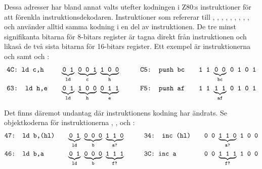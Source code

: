 \documentclass[main.tex]{subfiles}
\begin{document}
Dessa adresser har bland annat valts utefter kodningen i Z80:s instruktioner
för att förenkla instruktionsdekodaren. Instruktioner som refererar till
, , , , , , ,
, ,  och  använder alltid samma kodning i
en del av instruktionen. De tre minst signifikanta bitarna för 8-bitars
register är tagna direkt från instruktionen och likaså de två sista bitarna för
16-bitars register. Ett exempel är instruktionerna  och  samt  och :
\begin{align*}
    &\texttt{4C: ld c,h}& \quad &
    {\underbrace{\texttt{0 1}}_{\texttt{ld}}}\texttt{ }
    {\underbrace{\texttt{0 0 1}}_{\texttt{c}}}\texttt{ }
    {\underbrace{\texttt{1 0 0}}_{\texttt{h}}}
    \qquad
    &\texttt{C5: push bc}& \quad &
    \texttt{1 1 }
    {\underbrace{\texttt{0 0}}_{\texttt{bc}}}\texttt{ }
    \texttt{0 1 0 1}
    \\
    &\texttt{63: ld h,e} &&
    {\underbrace{\texttt{0 1}}_{\texttt{ld}}}\texttt{ }
    {\underbrace{\texttt{1 0 0}}_{\texttt{h}}}\texttt{ }
    {\underbrace{\texttt{0 1 1}}_{\texttt{e}}}
    &\texttt{F5: push af} &&
    \texttt{1 1 }
    {\underbrace{\texttt{1 1}}_{\texttt{af}}}\texttt{ }
    \texttt{0 1 0 1}
\end{align*}

Det finns däremot undantag där instruktionens kodning har ändrats. Se
objektkoderna för instruktionerna , ,  och :
\begin{align*}
    &\texttt{47: ld b,(hl)}& \quad &
    {\underbrace{\texttt{0 1}}_{\texttt{ld}}}\texttt{ }
    {\underbrace{\texttt{0 0 0}}_{\texttt{b}}}\texttt{ }
    {\underbrace{\texttt{1 1 0}}_{\texttt{a?}}}
    \qquad
    &&\texttt{34: inc (hl)} &\quad &
    \texttt{0 0 }
    {\underbrace{\texttt{1 1 0}}_{\texttt{a?}}}\texttt{ }
    \texttt{1 0 0}
    \\
    &\texttt{46: ld b,a} &&
    {\underbrace{\texttt{0 1}}_{\texttt{ld}}}\texttt{ }
    {\underbrace{\texttt{0 0 0}}_{\texttt{b}}}\texttt{ }
    {\underbrace{\texttt{1 1 1}}_{\texttt{f?}}}
    &&\texttt{3C: inc a} &&
    \texttt{0 0 }
    {\underbrace{\texttt{1 1 1}}_{\texttt{f?}}}\texttt{ }
    \texttt{1 0 0}
\end{align*}
\end{document}
